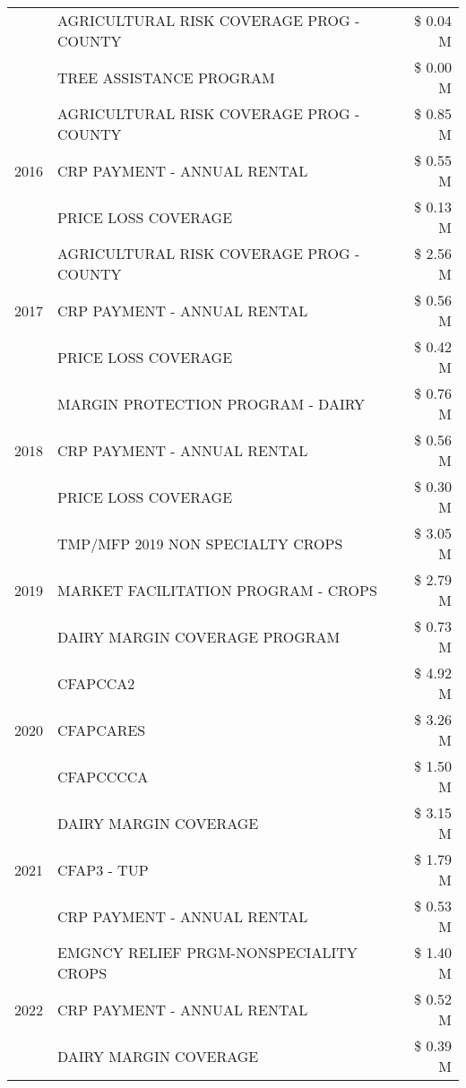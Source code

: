 \begin{tabular}{llr}
 & AGRICULTURAL RISK COVERAGE PROG - COUNTY & \$ 0.04 M \\
 & TREE ASSISTANCE PROGRAM & \$ 0.00 M \\
\cline{1-3}
\multirow[t]{3}{*}{2016} & AGRICULTURAL RISK COVERAGE PROG - COUNTY & \$ 0.85 M \\
 & CRP PAYMENT - ANNUAL RENTAL & \$ 0.55 M \\
 & PRICE LOSS COVERAGE & \$ 0.13 M \\
\cline{1-3}
\multirow[t]{3}{*}{2017} & AGRICULTURAL RISK COVERAGE PROG - COUNTY & \$ 2.56 M \\
 & CRP PAYMENT - ANNUAL RENTAL & \$ 0.56 M \\
 & PRICE LOSS COVERAGE & \$ 0.42 M \\
\cline{1-3}
\multirow[t]{3}{*}{2018} & MARGIN PROTECTION PROGRAM - DAIRY & \$ 0.76 M \\
 & CRP PAYMENT - ANNUAL RENTAL & \$ 0.56 M \\
 & PRICE LOSS COVERAGE & \$ 0.30 M \\
\cline{1-3}
\multirow[t]{3}{*}{2019} & TMP/MFP 2019 NON SPECIALTY CROPS & \$ 3.05 M \\
 & MARKET FACILITATION PROGRAM - CROPS & \$ 2.79 M \\
 & DAIRY MARGIN COVERAGE PROGRAM & \$ 0.73 M \\
\cline{1-3}
\multirow[t]{3}{*}{2020} & CFAPCCA2 & \$ 4.92 M \\
 & CFAPCARES & \$ 3.26 M \\
 & CFAPCCCCA & \$ 1.50 M \\
\cline{1-3}
\multirow[t]{3}{*}{2021} & DAIRY MARGIN COVERAGE & \$ 3.15 M \\
 & CFAP3 - TUP & \$ 1.79 M \\
 & CRP PAYMENT - ANNUAL RENTAL & \$ 0.53 M \\
\cline{1-3}
\multirow[t]{3}{*}{2022} & EMGNCY RELIEF PRGM-NONSPECIALITY CROPS & \$ 1.40 M \\
 & CRP PAYMENT - ANNUAL RENTAL & \$ 0.52 M \\
 & DAIRY MARGIN COVERAGE & \$ 0.39 M \\
\cline{1-3}
\bottomrule
\end{tabular}
